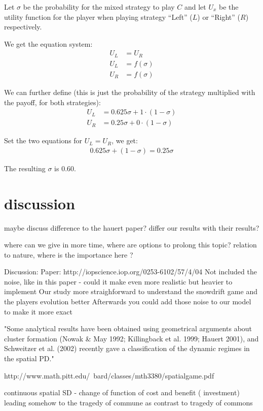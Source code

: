 \documentclass[DIV=calc, paper=a4, fontsize=11pt, twocolumn]{scrartcl}	 %
\begin{document}
Let $\sigma$ be the probability for the mixed strategy
to play $C$ and let $U_x$ be the utility function for the
player when playing strategy ``Left'' ($L$) or ``Right'' ($R$)
respectively.

We get the equation system:
\begin{align*}
  U_L &= U_R\\
  U_L &= f(\sigma)\\
  U_R &= f(\sigma)
\end{align*}

We can further define (this is just the probability
of the strategy multiplied with the payoff, for both
strategies):
\begin{align*}
  U_L &= 0.625\sigma + 1 \cdot (1-\sigma)\\
  U_R &= 0.25\sigma + 0 \cdot (1-\sigma)
\end{align*}

Set the two equations for $U_L = U_R$, we get:
\begin{align*}
0.625\sigma + (1-\sigma) =  0.25\sigma
\end{align*}

The resulting $\sigma$ is $0.60$. 


\section*{discussion}

maybe discuss difference to the hauert paper? 
differ our results with their results? 

where can we give in more time, where are options to prolong this topic? relation to nature, where is the importance here ? 

Discussion: 
Paper: http://iopscience.iop.org/0253-6102/57/4/04
Not included the noise, like in this paper  - could it make even more realistic but heavier to implement
Our study more straighforward to understand the snowdrift game and the players evolution better
Afterwards you could add those noise to our model to make it more exact

"Some analytical results have been obtained using geometrical arguments about cluster formation (Nowak \& May 1992; Killingback et al. 1999; Hauert 2001), and Schweitzer et al. (2002) recently gave a classification of the dynamic regimes in the spatial PD."

http://www.math.pitt.edu/~bard/classes/mth3380/spatialgame.pdf

continuous spatial SD - change of function of cost and benefit ( investment) leading somehow to the tragedy of commune as contrast to tragedy of commons 
\end{document}
